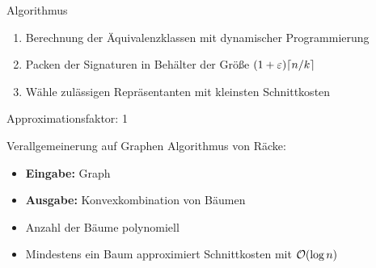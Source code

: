 \begin{frame}{Algorithmus}
    \begin{enumerate}[<+(1)->]
            \item Berechnung der Äquivalenzklassen mit dynamischer Programmierung
            \item Packen der Signaturen in Behälter der Größe $(1+\varepsilon) \lceil n/k\rceil$
            \item Wähle zulässigen Repräsentanten mit kleinsten Schnittkosten
    \end{enumerate}
    \pause
    Approximationsfaktor: 1
\end{frame}

\begin{frame}{Verallgemeinerung auf Graphen}
    \pause
    Algorithmus von Räcke:
    \begin{itemize}[<+(1)->]
        \item \textbf{Eingabe:} Graph
        \item \textbf{Ausgabe:} Konvexkombination von Bäumen
        \item Anzahl der Bäume polynomiell
        \item Mindestens ein Baum approximiert Schnittkosten mit $\mathcal{O}(\log n)$
    \end{itemize}
\end{frame}

